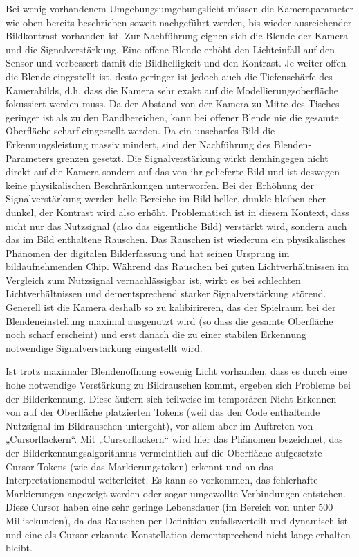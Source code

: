 Bei wenig vorhandenem Umgebungsumgebungslicht müssen die Kameraparameter wie oben bereits beschrieben soweit nachgeführt werden, bis wieder ausreichender Bildkontrast vorhanden ist. Zur Nachführung eignen sich die Blende der Kamera und die Signalverstärkung. Eine offene Blende erhöht den Lichteinfall auf den Sensor und verbessert damit die Bildhelligkeit und den Kontrast. Je weiter offen die Blende eingestellt ist, desto geringer ist jedoch auch die Tiefenschärfe des Kamerabilds, d.h. dass die Kamera sehr exakt auf die Modellierungsoberfläche fokussiert werden muss. Da der Abstand von der Kamera zu Mitte des Tisches geringer ist als zu den Randbereichen, kann bei offener Blende nie die gesamte Oberfläche scharf eingestellt werden. Da ein unscharfes Bild die Erkennungsleistung massiv mindert, sind der Nachführung des Blenden-Parameters grenzen gesetzt. Die Signalverstärkung wirkt demhingegen nicht direkt auf die Kamera sondern auf das von ihr gelieferte Bild und ist deswegen keine physikalischen Beschränkungen unterworfen. Bei der Erhöhung der Signalverstärkung werden helle Bereiche im Bild heller, dunkle bleiben eher dunkel, der Kontrast wird also erhöht. Problematisch ist in diesem Kontext, dass nicht nur das Nutzsignal (also das eigentliche Bild) verstärkt wird, sondern auch das im Bild enthaltene Rauschen. Das Rauschen ist wiederum ein physikalisches Phänomen der digitalen Bilderfassung und hat seinen Ursprung im bildaufnehmenden Chip. Während das Rauschen bei guten Lichtverhältnissen im Vergleich zum Nutzsignal vernachlässigbar ist, wirkt es bei schlechten Lichtverhältnissen und dementsprechend starker Signalverstärkung störend. Generell ist die Kamera deshalb so zu kalibirireren, das der Spielraum bei der Blendeneinstellung maximal ausgenutzt wird (so dass die gesamte Oberfläche noch scharf erscheint) und erst danach die zu einer stabilen Erkennung notwendige Signalverstärkung eingestellt wird.

Ist trotz maximaler Blendenöffnung sowenig Licht vorhanden, dass es durch eine hohe notwendige Verstärkung zu Bildrauschen kommt, ergeben sich Probleme bei der Bilderkennung. Diese äußern sich teilweise im temporären Nicht-Erkennen von auf der Oberfläche platzierten Tokens (weil das den Code enthaltende Nutzsignal im Bildrauschen untergeht), vor allem aber im Auftreten von „Cursorflackern“. Mit „Cursorflackern“ wird hier das Phänomen bezeichnet, das der Bilderkennungsalgorithmus vermeintlich auf die Oberfläche aufgesetzte Cursor-Tokens (wie das Markierungstoken) erkennt und an das Interpretationsmodul weiterleitet. Es kann so vorkommen, das fehlerhafte Markierungen angezeigt werden oder sogar umgewollte Verbindungen entstehen. Diese Cursor haben eine sehr geringe Lebensdauer (im Bereich von unter 500 Millisekunden), da das Rauschen per Definition zufallsverteilt und dynamisch ist und eine als Cursor erkannte Konstellation dementsprechend nicht lange erhalten bleibt. 

